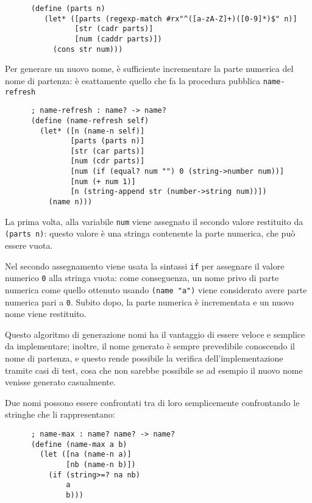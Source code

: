\begin{lstlisting}
      (define (parts n)
         (let* ([parts (regexp-match #rx"^([a-zA-Z]+)([0-9]*)$" n)]
                [str (cadr parts)]
                [num (caddr parts)])
           (cons str num)))
\end{lstlisting}

Per generare un nuovo nome, \`e sufficiente incrementare la parte numerica
del nome di partenza: \`e esattamente quello che fa la procedura pubblica
\lstinline{name-refresh}

\begin{lstlisting}
      ; name-refresh : name? -> name?
      (define (name-refresh self)
        (let* ([n (name-n self)]
               [parts (parts n)]
               [str (car parts)]
               [num (cdr parts)]
               [num (if (equal? num "") 0 (string->number num))]
               [num (+ num 1)]
               [n (string-append str (number->string num))])
          (name n)))
\end{lstlisting}

La prima volta, alla variabile \lstinline{num} viene assegnato il secondo
valore restituito da \lstinline{(parts n)}: questo valore \`e una stringa
contenente la parte numerica, che pu\`o essere vuota.

Nel secondo assegnamento viene usata la sintassi \lstinline{if} per
assegnare il valore numerico \lstinline{0} alla stringa vuota: come
conseguenza, un nome privo di parte numerica come quello ottenuto usando
\lstinline{(name "a")} viene considerato avere parte numerica pari a
\lstinline{0}. Subito dopo, la parte numerica \`e incrementata e un nuovo
nome viene restituito.

Questo algoritmo di generazione nomi ha il vantaggio di essere veloce e
semplice da implementare; inoltre, il nome generato \`e sempre prevedibile
conoscendo il nome di partenza, e questo rende possibile la verifica
dell'implementazione tramite casi di test, cosa che non sarebbe possibile
se ad esempio il nuovo nome venisse generato casualmente.

Due nomi possono essere confrontati tra di loro semplicemente confrontando
le stringhe che li rappresentano:

\begin{lstlisting}
      ; name-max : name? name? -> name?
      (define (name-max a b)
        (let ([na (name-n a)]
              [nb (name-n b)])
          (if (string>=? na nb)
              a
              b)))
\end{lstlisting}

